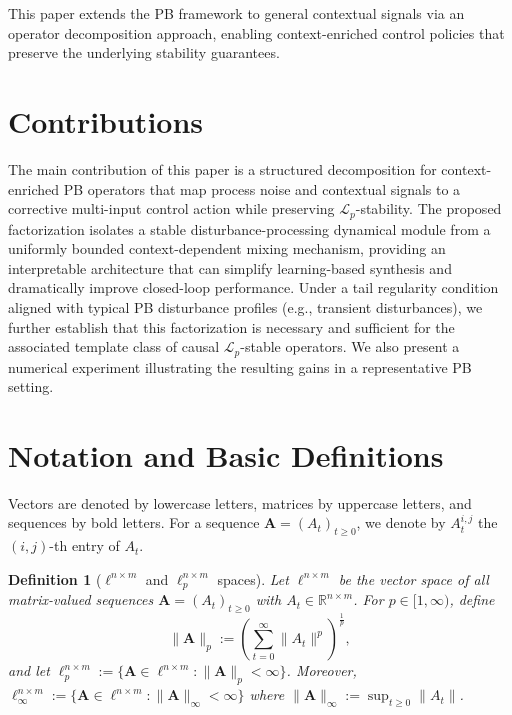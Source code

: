 \documentclass[journal,twoside,web]{ieeecolor}
\newtheorem{definition}{Definition}
\begin{document}
This paper extends the PB framework to general contextual signals via an operator decomposition approach, enabling context-enriched control policies that preserve the underlying stability guarantees.


\section{Contributions}
The main contribution of this paper is a structured decomposition for context-enriched PB operators that map process noise and contextual signals to a corrective multi-input control action while preserving $\mathcal L_p$-stability. The proposed factorization isolates a stable disturbance-processing dynamical module from a uniformly bounded context-dependent mixing mechanism, providing an interpretable architecture that can simplify learning-based synthesis and dramatically improve closed-loop performance. Under a tail regularity condition aligned with typical PB disturbance profiles (e.g., transient disturbances), we further establish that this factorization is necessary and sufficient for the associated template class of causal $\mathcal L_p$-stable operators. We also present a numerical experiment illustrating the resulting gains in a representative PB setting.






\section{Notation and Basic Definitions}

Vectors are denoted by lowercase letters, matrices by uppercase letters, and sequences by bold letters.
For a sequence $\mathbf{A}=(A_t)_{t\ge 0}$, we denote by $A_t^{i,j}$ the $(i,j)$-th entry of $A_t$.

\begin{definition}[$\ell^{n\times m}$ and $\ell_p^{n\times m}$ spaces]
Let $\ell^{n\times m}$ be the vector space of all matrix-valued sequences
$\mathbf{A}=(A_t)_{t\ge 0}$ with $A_t\in\mathbb R^{n\times m}$.
For $p\in[1,\infty)$, define
\[
\|\mathbf{A}\|_{p} := \left(\sum_{t=0}^{\infty} \|A_t\|^{p}\right)^{\frac{1}{p}},
\]
and let $\ell_p^{n\times m}:=\{\mathbf{A}\in \ell^{n\times m}:\|\mathbf{A}\|_p<\infty\}$.
Moreover, $\ell_\infty^{n\times m}:=\{\mathbf{A}\in \ell^{n\times m}:\|\mathbf{A}\|_\infty<\infty\}$ where
$\|\mathbf{A}\|_\infty := \sup_{t\ge 0}\|A_t\|$.
\end{definition}
\end{document}
